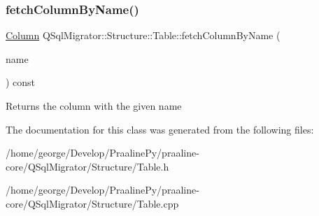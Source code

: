 \subsubsection{\texorpdfstring{fetch\+Column\+By\+Name()}{fetchColumnByName()}}
{\footnotesize\ttfamily \hyperlink{class_q_sql_migrator_1_1_structure_1_1_column}{Column} Q\+Sql\+Migrator\+::\+Structure\+::\+Table\+::fetch\+Column\+By\+Name (\begin{DoxyParamCaption}\item[{const Q\+String \&}]{name }\end{DoxyParamCaption}) const}

\begin{DoxyReturn}{Returns}
the column with the given name 
\end{DoxyReturn}


The documentation for this class was generated from the following files\+:\begin{DoxyCompactItemize}
\item 
/home/george/\+Develop/\+Praaline\+Py/praaline-\/core/\+Q\+Sql\+Migrator/\+Structure/Table.\+h\item 
/home/george/\+Develop/\+Praaline\+Py/praaline-\/core/\+Q\+Sql\+Migrator/\+Structure/Table.\+cpp\end{DoxyCompactItemize}
